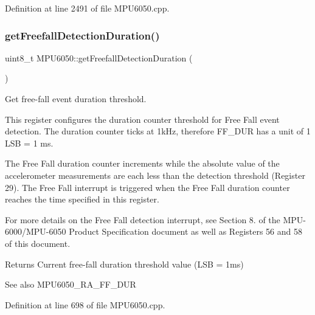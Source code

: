Definition at line 2491 of file M\+P\+U6050.\+cpp.

\mbox{\label{classMPU6050_a3cff6b9613ad01aa1a51c287f5c5e329}} 
\subsubsection{\texorpdfstring{getFreefallDetectionDuration()}{getFreefallDetectionDuration()}}
{\footnotesize\ttfamily uint8\+\_\+t M\+P\+U6050\+::get\+Freefall\+Detection\+Duration (\begin{DoxyParamCaption}{ }\end{DoxyParamCaption})}



Get free-\/fall event duration threshold. 

This register configures the duration counter threshold for Free Fall event detection. The duration counter ticks at 1k\+Hz, therefore F\+F\+\_\+\+D\+UR has a unit of 1 L\+SB = 1 ms.

The Free Fall duration counter increments while the absolute value of the accelerometer measurements are each less than the detection threshold (Register 29). The Free Fall interrupt is triggered when the Free Fall duration counter reaches the time specified in this register.

For more details on the Free Fall detection interrupt, see Section 8. of the M\+P\+U-\/6000/\+M\+P\+U-\/6050 Product Specification document as well as Registers 56 and 58 of this document.

\begin{DoxyReturn}{Returns}
Current free-\/fall duration threshold value (L\+SB = 1ms) 
\end{DoxyReturn}
\begin{DoxySeeAlso}{See also}
M\+P\+U6050\+\_\+\+R\+A\+\_\+\+F\+F\+\_\+\+D\+UR 
\end{DoxySeeAlso}


Definition at line 698 of file M\+P\+U6050.\+cpp.

\mbox{\label{classMPU6050_ac7f5c0511fe9d0f3525a3757498daed7}} 
